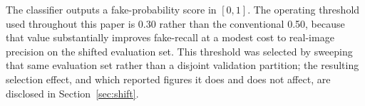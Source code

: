 \documentclass[conference,a4paper]{IEEEtran}
\begin{document}
%
%
%
The classifier outputs a fake-probability score in $[0,1]$. The operating
threshold used throughout this paper is 0.30 rather than the conventional
0.50, because that value substantially improves fake-recall at a modest cost
to real-image precision on the shifted evaluation set. This threshold was
selected by sweeping that same evaluation set rather than a disjoint
validation partition; the resulting selection effect, and which reported
figures it does and does not affect, are disclosed in
Section~\ref{sec:shift}.

\end{document}
